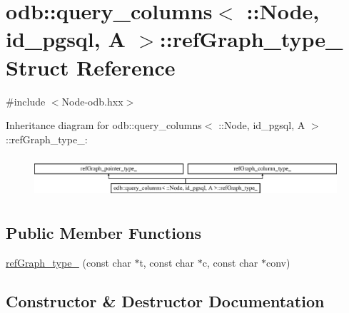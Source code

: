 \hypertarget{structodb_1_1query__columns_3_01_1_1_node_00_01id__pgsql_00_01_a_01_4_1_1ref_graph__type__}{}\section{odb\+:\+:query\+\_\+columns$<$ \+:\+:Node, id\+\_\+pgsql, A $>$\+:\+:ref\+Graph\+\_\+type\+\_\+ Struct Reference}
\label{structodb_1_1query__columns_3_01_1_1_node_00_01id__pgsql_00_01_a_01_4_1_1ref_graph__type__}


{\ttfamily \#include $<$Node-\/odb.\+hxx$>$}

Inheritance diagram for odb\+:\+:query\+\_\+columns$<$ \+:\+:Node, id\+\_\+pgsql, A $>$\+:\+:ref\+Graph\+\_\+type\+\_\+\+:\begin{figure}[H]
\begin{center}
\leavevmode
\includegraphics[height=1.555556cm]{d0/d06/structodb_1_1query__columns_3_01_1_1_node_00_01id__pgsql_00_01_a_01_4_1_1ref_graph__type__}
\end{center}
\end{figure}
\subsection*{Public Member Functions}
\begin{DoxyCompactItemize}
\item 
\hyperlink{structodb_1_1query__columns_3_01_1_1_node_00_01id__pgsql_00_01_a_01_4_1_1ref_graph__type___a394b1986f23687c74ff7422d82e45b55}{ref\+Graph\+\_\+type\+\_\+} (const char $\ast$t, const char $\ast$c, const char $\ast$conv)
\end{DoxyCompactItemize}


\subsection{Constructor \& Destructor Documentation}
\hypertarget{structodb_1_1query__columns_3_01_1_1_node_00_01id__pgsql_00_01_a_01_4_1_1ref_graph__type___a394b1986f23687c74ff7422d82e45b55}{}
